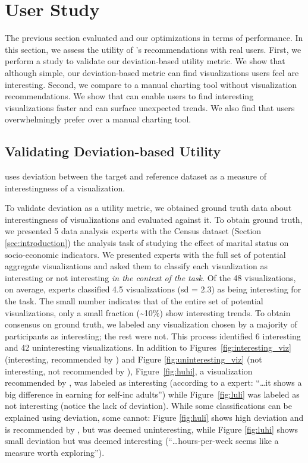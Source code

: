 
\section{User Study}
\label{sec:user_study}

The previous section evaluated \SeeDB 
and our optimizations in terms of performance.
In this section, we assess the utility of \SeeDB's recommendations 
with real users.
First, we perform a study to validate our deviation-based utility metric.
We show that although simple, our deviation-based
metric can find visualizations users feel are interesting.
Second, we compare \SeeDB
to a manual charting tool without visualization recommendations.
We show that \SeeDB can enable users to find interesting visualizations
faster and can surface unexpected trends.
We also find that users overwhelmingly prefer \SeeDB over a manual charting 
tool.

\subsection{Validating Deviation-based Utility}
\label{sec:validating_metric}

\SeeDB uses deviation between the target and reference dataset as a measure
of interestingness of a visualization.

To validate deviation as a utility metric, we obtained ground truth data about
interestingness of visualizations and evaluated \SeeDB against it.
To obtain ground truth, we presented 5 data analysis experts with the Census 
dataset (Section \ref{sec:introduction}) the analysis task of
studying the effect of marital status on socio-economic indicators.
We presented experts with the full set of potential aggregate visualizations 
and asked them to classify each visualization as interesting or
not interesting {\em in the context of the task}.
Of the 48 visualizations, on average, experts classified 4.5 visualizations
(sd = 2.3) as being interesting for the task.
The small number indicates that of the entire set of potential visualizations, 
only a small fraction (\textasciitilde10\%) show interesting trends.
To obtain consensus on ground truth, we labeled
any visualization chosen by a majority of participants as 
interesting; the rest were not. 
This process identified 6 interesting and 42 uninteresting visualizations.
In addition to Figures~\ref{fig:interesting_viz} (interesting, recommended by \SeeDB) 
and Figure \ref{fig:uninteresting_viz} (not interesting, not recommended by \SeeDB), 
Figure~\ref{fig:huhi}, a
visualization recommended by \SeeDB, 
was labeled as interesting (according to a expert: ``\ldots it
shows a big difference in earning for self-inc adults'') while 
Figure~\ref{fig:luli} was labeled as not interesting (notice the lack of deviation).
While some classifications can be explained using deviation, some cannot: 
Figure \ref{fig:huli} shows high deviation and is recommended by \SeeDB, 
but was deemed uninteresting, while Figure \ref{fig:luhi} shows small 
deviation but was deemed interesting (``\ldots hours-per-week seems like a 
measure worth exploring''). 

